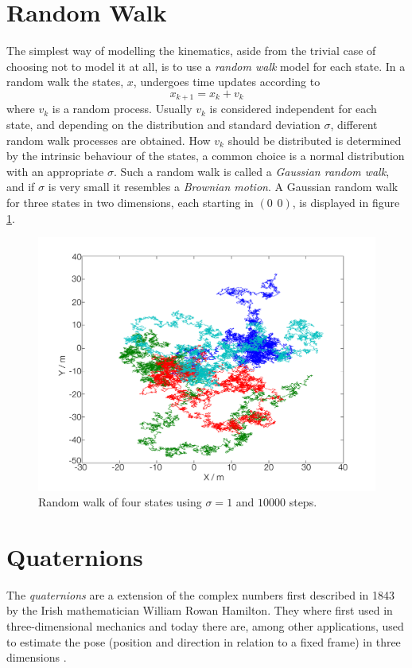 \documentclass{LTHthesis}
\begin{document}
\section{Random Walk}
%
The simplest way of modelling the kinematics, aside from the trivial case of choosing not to model it at all, is to use a \emph{random walk} model for each state. In a random walk the states, $x$, undergoes time updates according to
%
\begin{equation}
x_{k+1} = x_k + v_k
\end{equation}      
%
where $v_k$ is a random process. Usually $v_k$ is considered independent for each state, and depending on the distribution and standard deviation $\sigma$, different random walk processes are obtained. How $v_k$ should be distributed is determined by the intrinsic behaviour of the states, a common choice is a normal distribution with an appropriate $\sigma$. Such a random walk is called a \emph{Gaussian random walk}, and if $\sigma$ is very small it resembles a \emph{Brownian motion}. A Gaussian random walk for three states in two dimensions, each starting in $(0\hspace{5pt}0)$, is displayed in figure \ref{rand_walk}. 
%
\begin{figure}[!hbt]

\includegraphics[width=1\textwidth ]{images/kinematic/rand_walk}
\caption{Random walk of four states using $\sigma = 1$ and $10000$ steps.}\label{rand_walk}
\end{figure}
%
\section{Quaternions}
%
The \emph{quaternions} are a extension of the complex numbers first described in 1843 by the Irish mathematician William Rowan Hamilton. They where first used in three-dimensional mechanics and today there are, among other applications, used to estimate the pose (position and direction in relation to a fixed frame) in three dimensions \cite{mann13}.
%
\end{document}
